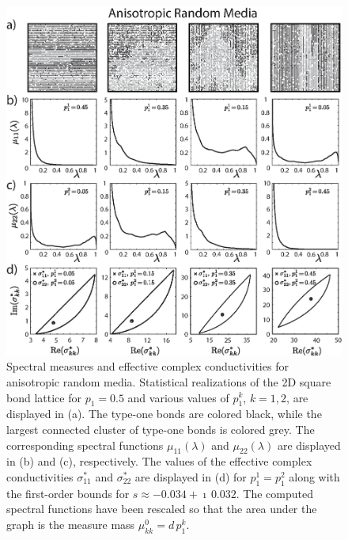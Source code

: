 \documentclass{cmslatex}
\begin{document}
%
\begin{figure}[t]
  \centerline{\includegraphics[scale=0.74]{Anisotropic_RRN_p=0_5.eps}} 
\caption{Spectral measures and effective complex conductivities for
  anisotropic random media. Statistical realizations of the 2D square
  bond lattice for $p_1=0.5$ and various values of $p_1^k$, $k=1,2$,
  are displayed in (a). The type-one bonds are colored black, while
  the largest connected cluster of type-one bonds is colored grey. The
  corresponding spectral functions $\mu_{11}(\lambda)$ and $\mu_{22}(\lambda)$ are
  displayed in (b) and (c), respectively. The values of the
  effective complex conductivities $\sigma^*_{11}$ and $\sigma^*_{22}$ are
  displayed in (d) for $p_1^1=p_1^2$ along with the first-order
  bounds for $s\approx-0.034+\imath\,0.032$. The computed spectral functions have
  been rescaled so that   the area under the graph is the measure mass
  $\mu^0_{kk}=d\,p_1^k$.     
        }
\label{fig:Anisotropic_Spectral_Measures}
\end{figure}
%
\end{document}
